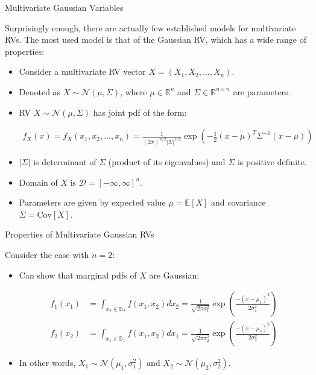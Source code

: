 \documentclass[9pt]{beamer}
\begin{document}
%
\begin{frame}{Multivariate Gaussian Variables}

Surprisingly enough, there are actually few established models for multivariate RVs.  The most used model is that of the Gaussian RV, which has a wide range of properties:

\begin{itemize}
\setlength{\itemsep}{10pt}
\item Consider a multivariate RV vector $X=(X_1,X_2,...,X_n)$.

\item Denoted as $X\sim \mathcal{N}(\mu,\Sigma)$, where $\mu\in \mathbb{R}^n$ and $\Sigma\in \mathbb{R}^{n\times n}$ are parameters. 

\item RV $X\sim \mathcal{N}(\mu,\Sigma)$ has joint pdf of the form:
\begin{block}{}
\begin{align*}
f_X(x)=f_X(x_1,x_2,...,x_n)=\frac{1}{(2\pi)^{n/2}|\Sigma|^{1/2}}\exp\left(-\frac{1}{2}(x-\mu)^T\Sigma^{-1}(x-\mu)\right)
\end{align*}
\end{block}
\item $|\Sigma|$ is determinant of  $\Sigma$ (product of its eigenvalues) and $\Sigma$ is positive definite. 

\item Domain of $X$ is $\mathcal{D}=[-\infty,\infty]^n$. 

\item Parameters are given by expected value $\mu=\mathbb{E}[X]$ and covariance $\Sigma=\textrm{Cov}[X]$.

\end{itemize}

\end{frame}

%
\begin{frame}{Properties of Multivariate Gaussian RVs}

Consider the case with $n=2$:
\begin{itemize}
\setlength{\itemsep}{10pt}
\item Can show that marginal pdfs of $X$ are Gaussian:
\begin{block}{}
\begin{align*}
f_1(x_1)&=\int_{x_2\in \mathbb{D}_2}f(x_1,x_2)dx_2=\frac{1}{\sqrt{2\pi\sigma_1^2}}\exp \left({\frac{-(x-\mu_1)^2}{2\sigma_1^2}}\right)\\
f_2(x_2)&=\int_{x_1\in \mathbb{D}_1}f(x_1,x_2)dx_1=\frac{1}{\sqrt{2\pi\sigma_2^2}}\exp \left({\frac{-(x-\mu_2)^2}{2\sigma_2^2}}\right)
\end{align*} 
\end{block}
\item In other words, $X_1\sim\mathcal{N}(\mu_1,\sigma_1^2)$ and $X_2\sim\mathcal{N}(\mu_2,\sigma_2^2)$.
\end{itemize}
\end{frame}
\end{document}
